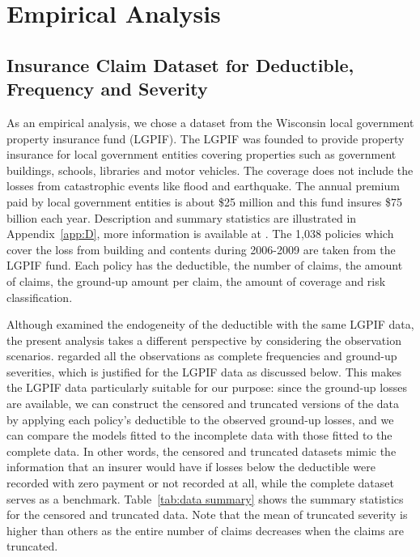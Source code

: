 \documentclass[11pt]{article}
\newcommand{\rev}[1]{{\color{blue}#1}}
\begin{document}
{ \FloatBarrier


\section{Empirical Analysis}\label{sec:empirical}
\subsection{Insurance Claim Dataset for Deductible, Frequency and Severity}

As an empirical analysis, we chose a dataset from the Wisconsin local government property insurance fund (LGPIF). The LGPIF was founded to provide property insurance for local government entities covering properties such as government buildings, schools, libraries and motor vehicles. The coverage does not include the losses from catastrophic events like flood and earthquake. The annual premium paid by local government entities is about \$25 million and this fund insures \$75  billion each year. Description and summary statistics are illustrated in Appendix~\ref{app:D}, more information is {available at} \cite{lgpifwebpage}. The 1,038 policies which cover the loss from building and contents during 2006-2009 are taken from the LGPIF fund. Each policy has the deductible, the number of claims, the amount of claims, the ground-up amount per claim, the amount of coverage and risk classification. %

{Although \citet{shi2022copula} examined the endogeneity of the deductible with the same LGPIF data, the present analysis takes a different perspective by considering the observation scenarios. \citet{shi2022copula} regarded all the observations as complete frequencies and ground-up severities, which is justified for the LGPIF data as discussed below. This makes the LGPIF data particularly suitable for our purpose: since the ground-up losses are available, we can construct the censored and truncated versions of the data by applying each policy's deductible to the observed ground-up losses, and we can compare the models fitted to the incomplete data with those fitted to the complete data. In other words, the censored and truncated datasets mimic the information that an insurer would have if losses below the deductible were recorded with zero payment or not recorded at all, while the complete dataset serves as a benchmark.} Table~\ref{tab:data summary} shows the summary statistics for the censored and truncated data. Note that the mean of truncated severity is higher than others as the entire number of claims decreases when the claims are truncated.

}
\end{document}
